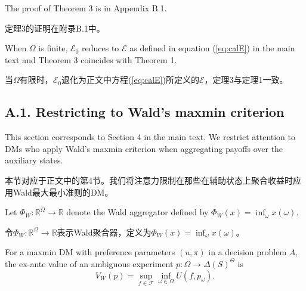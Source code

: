 \documentclass[12pt,a4paper]{article}
\newenvironment{original}
  {\par\vspace{4pt}\noindent\color{black}\ignorespaces}
  {\par\vspace{2pt}}
\newenvironment{translation}
  {\par\vspace{2pt}\noindent\color{myblue}\ignorespaces}
  {\par\vspace{6pt}}
\newcommand{\bisubsection}[2]{%
  \subsection{#1}%
  \vspace{-2pt}%
  \noindent{\color{myblue}\bfseries #2}%
  \vspace{4pt}%
}
\newcommand{\R}{\mathbb{R}}
\newcommand{\Delt}{\Delta}
\newcommand{\calF}{\mathcal{F}}
\newcommand{\calE}{\mathcal{E}}
\begin{document}
\begin{original}
The proof of Theorem 3 is in Appendix B.1.
\end{original}

\begin{translation}
定理3的证明在附录B.1中。
\end{translation}

\begin{original}
When $\Omega$ is finite, $\calE_0$ reduces to $\calE$ as defined in equation (\ref{eq:calE}) in the main text and Theorem 3 coincides with Theorem 1.
\end{original}

\begin{translation}
当$\Omega$有限时，$\calE_0$退化为正文中方程(\ref{eq:calE})所定义的$\calE$，定理3与定理1一致。
\end{translation}


\bisubsection{A.1. Restricting to Wald's maxmin criterion}{A.1. 限制于Wald最大最小准则}

\begin{original}
This section corresponds to Section 4 in the main text. We restrict attention to DMs who apply Wald's maxmin criterion when aggregating payoffs over the auxiliary states.
\end{original}

\begin{translation}
本节对应于正文中的第4节。我们将注意力限制在那些在辅助状态上聚合收益时应用Wald最大最小准则的DM。
\end{translation}

\begin{original}
Let $\Phi_W:\R^{\Omega}\to\R$ denote the Wald aggregator defined by $\Phi_W(x)=\inf_{\omega} x(\omega)$.
\end{original}

\begin{translation}
令$\Phi_W:\R^{\Omega}\to\R$表示Wald聚合器，定义为$\Phi_W(x)=\inf_{\omega} x(\omega)$。
\end{translation}

\begin{original}
For a maxmin DM with preference parameters $(u,\pi)$ in a decision problem $A$, the ex-ante value of an ambiguous experiment $p:\Omega\to\Delt(S)^{\Theta}$ is
\begin{equation}
    V_W(p) = \sup_{f\in\calF} \inf_{\omega\in\Omega} U(f, p_{\omega}).
\end{equation}
\end{original}
\end{document}
